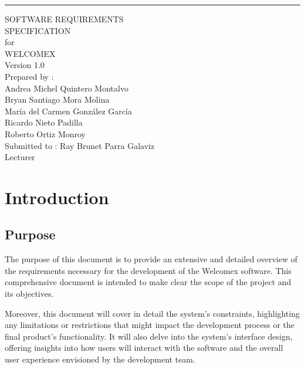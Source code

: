 \documentclass{scrreprt}
\date{}
\def\myversion{1.0 }
\begin{document}
\begin{flushright}
    \rule{16cm}{5pt}\vskip1cm
    \begin{bfseries}
        \Huge{SOFTWARE REQUIREMENTS\\ SPECIFICATION}\\
        \vspace{1.5cm}
        for\\
        \vspace{1.5cm}
        WELCOMEX\\
        \vspace{1.5cm}
        \LARGE{Version \myversion}\\
        \vspace{1.5cm}
        Prepared by :  \\
        Andrea Michel Quintero Montalvo\\
        Bryan Santiago Mora Molina\\
        María del Carmen González García\\
        Ricardo Nieto Padilla\\
        Roberto Ortiz Monroy\\
        \vspace{1.5cm}
        Submitted to : Ray Brunet Parra Galaviz \\Lecturer\\
        \vspace{1.5cm}
    \end{bfseries}
\end{flushright}

\tableofcontents

\listoffigures

\chapter{Introduction}

\section{Purpose}
The purpose of this document is to provide an extensive and detailed overview of the requirements necessary for the development of the Welcomex software. This comprehensive document is intended to make clear the scope of the project and its objectives.

Moreover, this document will cover in detail the system's constraints, highlighting any limitations or restrictions that might impact the development process or the final product's functionality. It will also delve into the system's interface design, offering insights into how users will interact with the software and the overall user experience envisioned by the development team.
\end{document}
